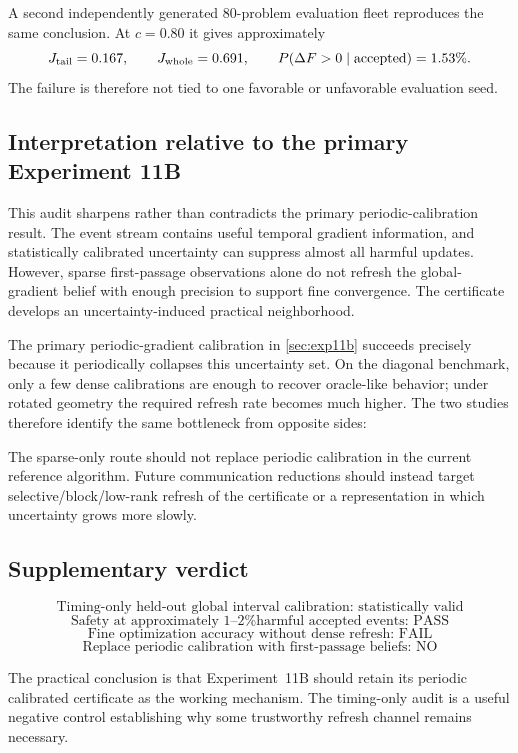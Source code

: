 A second independently generated 80-problem evaluation fleet reproduces the same conclusion. At $c=0.80$ it gives approximately
\begin{equation}
  J_{\rm tail}=0.167,
  \qquad
  J_{\rm whole}=0.691,
  \qquad
  P(\Delta F>0\mid\text{accepted})=1.53\%.
\end{equation}
The failure is therefore not tied to one favorable or unfavorable evaluation seed.

\subsection{Interpretation relative to the primary Experiment 11B}

This audit sharpens rather than contradicts the primary periodic-calibration result. The event stream contains useful temporal gradient information, and statistically calibrated uncertainty can suppress almost all harmful updates. However, sparse first-passage observations alone do not refresh the global-gradient belief with enough precision to support fine convergence. The certificate develops an uncertainty-induced practical neighborhood.

The primary periodic-gradient calibration in \cref{sec:exp11b} succeeds precisely because it periodically collapses this uncertainty set. On the diagonal benchmark, only a few dense calibrations are enough to recover oracle-like behavior; under rotated geometry the required refresh rate becomes much higher. The two studies therefore identify the same bottleneck from opposite sides:
\begin{center}
\end{center}

The sparse-only route should not replace periodic calibration in the current reference algorithm. Future communication reductions should instead target selective/block/low-rank refresh of the certificate or a representation in which uncertainty grows more slowly.

\subsection{Supplementary verdict}

\begin{equation}
  \boxed{\text{Timing-only held-out global interval calibration: statistically valid}}
\end{equation}
\begin{equation}
  \boxed{\text{Safety at approximately 1--2\% harmful accepted events: PASS}}
\end{equation}
\begin{equation}
  \boxed{\text{Fine optimization accuracy without dense refresh: FAIL}}
\end{equation}
\begin{equation}
  \boxed{\text{Replace periodic calibration with first-passage beliefs: NO}}
\end{equation}

The practical conclusion is that Experiment~11B should retain its periodic calibrated certificate as the working mechanism. The timing-only audit is a useful negative control establishing why some trustworthy refresh channel remains necessary.

